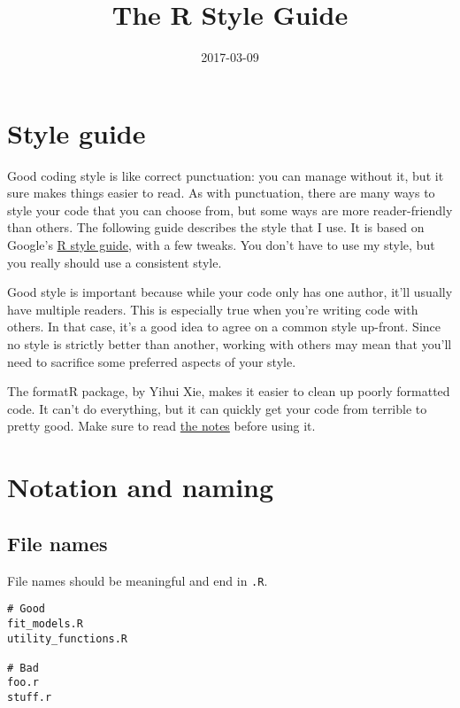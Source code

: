 \documentclass[]{book}
\title{The R Style Guide}
\author{}
\date{2017-03-09}
\begin{document}
\maketitle

{
\setcounter{tocdepth}{1}
\tableofcontents
}
\chapter{Style guide}\label{style}

Good coding style is like correct punctuation: you can manage without
it, but it sure makes things easier to read. As with punctuation, there
are many ways to style your code that you can choose from, but some ways
are more reader-friendly than others. The following guide describes the
style that I use. It is based on Google's
\href{http://google-styleguide.googlecode.com/svn/trunk/google-r-style.html}{R
style guide}, with a few tweaks. You don't have to use my style, but you
really should use a consistent style. 

Good style is important because while your code only has one author,
it'll usually have multiple readers. This is especially true when you're
writing code with others. In that case, it's a good idea to agree on a
common style up-front. Since no style is strictly better than another,
working with others may mean that you'll need to sacrifice some
preferred aspects of your style.

The formatR package, by Yihui Xie, makes it easier to clean up poorly
formatted code. It can't do everything, but it can quickly get your code
from terrible to pretty good. Make sure to read
\href{https://yihui.name/formatR/}{the notes} before using it.

\chapter{Notation and naming}\label{style-notnam}

\section{File names}\label{file-names}

File names should be meaningful and end in \texttt{.R}.

\begin{verbatim}
# Good
fit_models.R
utility_functions.R

# Bad
foo.r
stuff.r
\end{verbatim}
\end{document}
